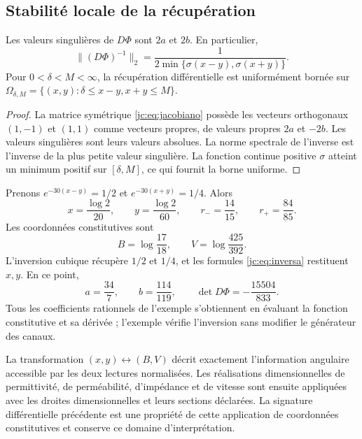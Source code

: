 \subsection{Stabilité locale de la récupération}

\begin{proposition}
Les valeurs singulières de $D\Phi$ sont $2a$ et $2b$. En particulier,
\[
\bigl\|(D\Phi)^{-1}\bigr\|_2
=\frac1{2\min\{\sigma(x-y),\sigma(x+y)\}}.
\]
Pour $0<\delta<M<\infty$, la récupération différentielle est uniformément bornée sur $\Omega_{\delta,M}=\{(x,y):\delta\le x-y,x+y\le M\}$.
\end{proposition}
\begin{proof}
La matrice symétrique \eqref{jc:eq:jacobiano} possède les vecteurs orthogonaux $(1,-1)$ et $(1,1)$ comme vecteurs propres, de valeurs propres $2a$ et $-2b$. Les valeurs singulières sont leurs valeurs absolues. La norme spectrale de l’inverse est l’inverse de la plus petite valeur singulière. La fonction continue positive $\sigma$ atteint un minimum positif sur $[\delta,M]$, ce qui fournit la borne uniforme.
\end{proof}

\begin{example}
Prenons $e^{-30(x-y)}=1/2$ et $e^{-30(x+y)}=1/4$. Alors
\[
x=\frac{\log2}{20},\qquad y=\frac{\log2}{60},\qquad
r_-=\frac{14}{15},\qquad r_+=\frac{84}{85}.
\]
Les coordonnées constitutives sont
\[
B=\log\frac{17}{18},\qquad V=\log\frac{425}{392}.
\]
L’inversion cubique récupère $1/2$ et $1/4$, et les formules \eqref{jc:eq:inversa} restituent $x,y$. En ce point,
\[
a=\frac{34}{7},\qquad b=\frac{114}{119},\qquad
\det D\Phi=-\frac{15504}{833}.
\]
Tous les coefficients rationnels de l’exemple s’obtiennent en évaluant la fonction constitutive et sa dérivée ; l’exemple vérifie l’inversion sans modifier le générateur des canaux.
\end{example}

La transformation $(x,y)\leftrightarrow(B,V)$ décrit exactement l’information angulaire accessible par les deux lectures normalisées. Les réalisations dimensionnelles de permittivité, de perméabilité, d’impédance et de vitesse sont ensuite appliquées avec les droites dimensionnelles et leurs sections déclarées. La signature différentielle précédente est une propriété de cette application de coordonnées constitutives et conserve ce domaine d’interprétation.
